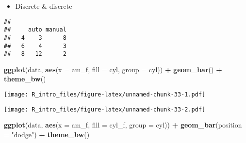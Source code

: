 \documentclass[
  a4paper,
]{article}
\newenvironment{Shaded}{\begin{snugshade}}{\end{snugshade}}
\newcommand{\AttributeTok}[1]{\textcolor[rgb]{0.13,0.29,0.53}{#1}}
\newcommand{\FunctionTok}[1]{\textcolor[rgb]{0.13,0.29,0.53}{\textbf{#1}}}
\newcommand{\NormalTok}[1]{#1}
\newcommand{\OtherTok}[1]{\textcolor[rgb]{0.56,0.35,0.01}{#1}}
\newcommand{\SpecialCharTok}[1]{\textcolor[rgb]{0.81,0.36,0.00}{\textbf{#1}}}
\newcommand{\StringTok}[1]{\textcolor[rgb]{0.31,0.60,0.02}{#1}}
\providecommand{\tightlist}{%
  \setlength{\itemsep}{0pt}\setlength{\parskip}{0pt}}
\begin{document}
\begin{itemize}
\tightlist
\item
  Discrete \& discrete
\end{itemize}

\begin{Shaded}
\end{Shaded}

\begin{verbatim}
##    
##     auto manual
##   4    3      8
##   6    4      3
##   8   12      2
\end{verbatim}

\begin{Shaded}
\begin{Highlighting}[]
\FunctionTok{ggplot}\NormalTok{(data, }\FunctionTok{aes}\NormalTok{(}\AttributeTok{x =}\NormalTok{ am\_f, }\AttributeTok{fill =}\NormalTok{ cyl, }\AttributeTok{group =}\NormalTok{ cyl)) }\SpecialCharTok{+} \FunctionTok{geom\_bar}\NormalTok{() }\SpecialCharTok{+}
    \FunctionTok{theme\_bw}\NormalTok{()}
\end{Highlighting}
\end{Shaded}

\texttt{[image: R\_intro\_files/figure-latex/unnamed-chunk-33-1.pdf]}

\begin{Shaded}
\end{Shaded}

\texttt{[image: R\_intro\_files/figure-latex/unnamed-chunk-33-2.pdf]}

\begin{Shaded}
\begin{Highlighting}[]
\FunctionTok{ggplot}\NormalTok{(data, }\FunctionTok{aes}\NormalTok{(}\AttributeTok{x =}\NormalTok{ am\_f, }\AttributeTok{fill =}\NormalTok{ cyl\_f, }\AttributeTok{group =}\NormalTok{ cyl)) }\SpecialCharTok{+} \FunctionTok{geom\_bar}\NormalTok{(}\AttributeTok{position =} \StringTok{"dodge"}\NormalTok{) }\SpecialCharTok{+}
    \FunctionTok{theme\_bw}\NormalTok{()}
\end{Highlighting}
\end{Shaded}
\end{document}
